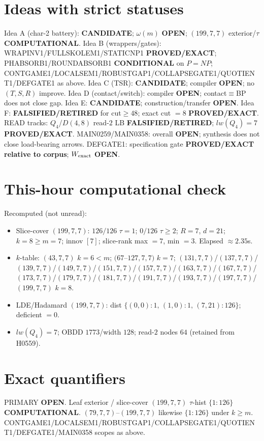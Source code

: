 \documentclass[11pt]{article}
\begin{document}
\section*{Ideas with strict statuses}
Idea A (char-2 battery): \textbf{CANDIDATE}; $\omega(m)$ \textbf{OPEN}; $(199,7,7)$ exterior/$\tau$ \textbf{COMPUTATIONAL}.
Idea B (wrappers/gates): WRAPINV1/FULLSKOLEM1/STATICNP1 \textbf{PROVED/EXACT};
PHABSORB1/ROUNDABSORB1 \textbf{CONDITIONAL} on $P=NP$;
CONTGAME1/LOCALSEM1/ROBUSTGAP1/COLLAPSEGATE1/QUOTIENT1/DEFGATE1 as above.
Idea C (TSR): \textbf{CANDIDATE}; compiler \textbf{OPEN}; no $(T,S,R)$ improve.
Idea D (contact/switch): compiler \textbf{OPEN}; contact$\equiv$BP does not close gap.
Idea E: \textbf{CANDIDATE}; construction/transfer \textbf{OPEN}.
Idea F: \textbf{FALSIFIED/RETIRED} for cut$\ge48$; exact cut $=8$ \textbf{PROVED/EXACT}.
READ tracks: $Q_4$/$D(4,8)$ read-$2$ LB \textbf{FALSIFIED/RETIRED}; $lw(Q_4)=7$ \textbf{PROVED/EXACT}.
MAIN0259/MAIN0358: overall \textbf{OPEN}; synthesis does not close load-bearing arrows.
DEFGATE1: specification gate \textbf{PROVED/EXACT relative to corpus}; $W_{\rm exact}$ \textbf{OPEN}.

\section*{This-hour computational check}
Recomputed (not unread):
\begin{itemize}
\item Slice-cover $(199,7,7)$: $126/126$ $\tau{=}1$; $0/126$ $\tau{\ge}2$; $R{=}7$, $d{=}21$;
  $k{=}8{\ge}m{=}7$; innov $[7]$; slice-rank max $=7$, min $=3$. Elapsed $\approx2.35$s.
\item $k$-table: $(43,7,7)$ $k{=}6{<}m$; $(67$--$127,7,7)$ $k{=}7$;
  $(131,7,7)$/$(137,7,7)$/$(139,7,7)$/$(149,7,7)$/$(151,7,7)$/$(157,7,7)$/$(163,7,7)$/$(167,7,7)$/$(173,7,7)$/$(179,7,7)$/$(181,7,7)$/$(191,7,7)$/$(193,7,7)$/$(197,7,7)$/$(199,7,7)$ $k{=}8$.
\item LDE/Hadamard $(199,7,7)$: dist $\{(0,0){:}1,\,(1,0){:}1,\,(7,21){:}126\}$; deficient $=0$.
\item $lw(Q_4)=7$; OBDD $1773$/width $128$; read-$2$ nodes $64$ (retained from H0559).
\end{itemize}

\section*{Exact quantifiers}
PRIMARY \textbf{OPEN}. Leaf exterior / slice-cover $(199,7,7)$ $\tau$-hist $\{1{:}126\}$ \textbf{COMPUTATIONAL}.
$(79,7,7)$--$(199,7,7)$ likewise $\{1{:}126\}$ under $k{\ge}m$. CONTGAME1/LOCALSEM1/ROBUSTGAP1/COLLAPSEGATE1/QUOTIENT1/DEFGATE1/MAIN0358 scopes as above.
\end{document}
